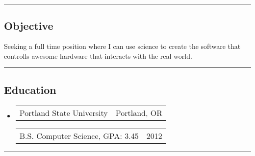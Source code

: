 \documentclass[10pt,letterpaper]{article}
\author{Eric Dinger}
\makeatletter
\newcommand{\heading}[2]
{\begin{tabular*}{\linewidth}{l@{\extracolsep{\fill}}r}
#1 &
#2 \\
\end{tabular*}}
\makeatother
\begin{document}
 \renewcommand*\arraystretch{1.5}


\hrule
\vspace{-.4em}

\subsection*{Objective}
Seeking a full time position where I can use science to create the software that controlls awesome hardware that interacts with the real world.
\vspace{.4em}
\hrule
\vspace{-.2em}

\subsection*{Education}
	\begin{itemize}
	\item
		\heading
			{Portland State University}
			{Portland, OR}

		\vspace{-1em}
		\heading 
			{ B.S. Computer Science, GPA: 3.45}
			{2012}
	\end{itemize}

\hrule
\end{document}

